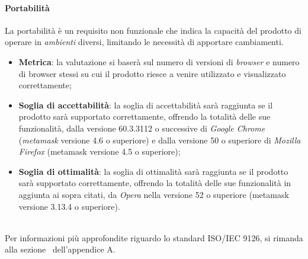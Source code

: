 \paragraph{Portabilità}
La portabilità è un requisito non funzionale che indica la capacità del prodotto di operare in \textit{ambienti} diversi, limitando le necessità di apportare cambiamenti.
\begin{itemize}
	\item \textbf{Metrica}: la valutazione si baserà sul numero di versioni di \emph{browser} e numero di browser stessi su cui il prodotto riesce a venire utilizzato e visualizzato correttamente;
	\item \textbf{Soglia di accettabilità}: la soglia di accettabilità sarà raggiunta se il prodotto sarà supportato correttamente, offrendo la totalità delle sue funzionalità, dalla versione 60.3.3112 o successive di \emph{Google Chrome} (\emph{metamask} versione 4.6 o superiore) e dalla versione 50 o superiore di \emph{Mozilla Firefox} (metamask versione 4.5 o superiore);
	\item \textbf{Soglia di ottimalità}: la soglia di ottimalità sarà raggiunta se il prodotto sarà supportato correttamente, offrendo la totalità delle sue funzionalità in aggiunta ai sopra citati, da \emph{Opera} nella versione 52 o superiore (metamask versione 3.13.4 o superiore).
\end{itemize}

~\\
Per informazioni più approfondite riguardo lo standard ISO/IEC 9126, si rimanda alla sezione~ dell'appendice A.



